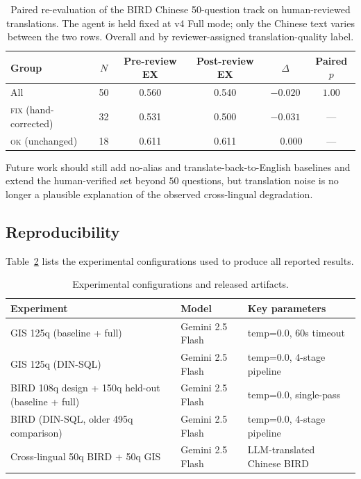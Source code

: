 \documentclass[11pt]{article}
\begin{document}
\begin{table}[t]
\centering
\caption{Paired re-evaluation of the BIRD Chinese 50-question track on human-reviewed translations. The agent is held fixed at v4 Full mode; only the Chinese text varies between the two rows. Overall and by reviewer-assigned translation-quality label.}
\label{tab:crosslingual-rereview}
\begin{tabular}{lccccc}
\toprule
Group & $N$ & Pre-review EX & Post-review EX & $\Delta$ & Paired $p$ \\
\midrule
All          & 50 & 0.560 & 0.540 & $-0.020$ & $1.00$ \\
\textsc{fix} (hand-corrected) & 32 & 0.531 & 0.500 & $-0.031$ & --- \\
\textsc{ok}  (unchanged)      & 18 & 0.611 & 0.611 & $\phantom{+}0.000$ & --- \\
\bottomrule
\end{tabular}
\end{table}

Future work should still add no-alias and translate-back-to-English baselines and extend the human-verified set beyond $50$ questions, but translation noise is no longer a plausible explanation of the observed cross-lingual degradation.

\subsection{Reproducibility}

Table~\ref{tab:repro} lists the experimental configurations used to produce all reported results.

\begin{table}[t]
\centering
\caption{Experimental configurations and released artifacts.}
\label{tab:repro}
\begin{tabular}{lll}
\toprule
Experiment & Model & Key parameters \\
\midrule
GIS 125q (baseline + full) & Gemini 2.5 Flash & temp=0.0, 60s timeout \\
GIS 125q (DIN-SQL) & Gemini 2.5 Flash & temp=0.0, 4-stage pipeline \\
BIRD 108q design + 150q held-out (baseline + full) & Gemini 2.5 Flash & temp=0.0, single-pass \\
BIRD (DIN-SQL, older 495q comparison) & Gemini 2.5 Flash & temp=0.0, 4-stage pipeline \\
Cross-lingual 50q BIRD + 50q GIS & Gemini 2.5 Flash & LLM-translated Chinese BIRD \\
\bottomrule
\end{tabular}
\end{table}
\end{document}
